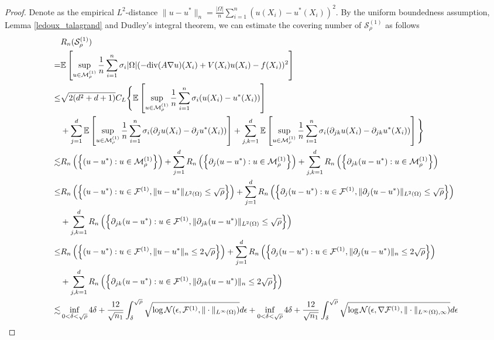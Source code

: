 \documentclass{article}
\newcommand{\E}{\mathbb{E}}
\newcommand{\F}{\mathcal{F}}
\newcommand{\N}{\mathcal{N}}
\renewcommand{\div}{\textnormal{div}}
\theoremstyle{plain}
\theoremstyle{definition}
\theoremstyle{remark}
\begin{document}
\begin{proof}
        Denote as the empirical $L^2$-distance $\|u-u^*\|_n = \frac{|\Omega|}{n}\sum_{i=1}^n (u(X_i) - u^*(X_i))^2$. 
        By the uniform boundedness assumption, Lemma \ref{ledoux_talagrand} and Dudley's integral theorem, we can estimate the covering number of $\mathcal{S}_\rho^{(1)}$ as follows
        \begin{align*}
            & R_{n}(\mathcal{S}_\rho^{(1)}) \\  = & \E \left[\sup_{u \in \mathcal{M}_\rho^{(1)}} \frac{1}{n} \sum_{i=1}^{n} \sigma_i |\Omega|(-\div(A \nabla u)(X_i) + V(X_i) u(X_i)  -f(X_i) )^2\right] \\
             \leq & \sqrt{2(d^2+d+1)} C_L \Bigg\{\E \left[\sup_{u \in \mathcal{M}_\rho^{(1)}} \frac{1}{n} \sum_{i=1}^{n} \sigma_i (u(X_i) - u^*(X_i)) \right]  \\
            & +  \sum_{j=1}^d \E \left[\sup_{u \in \mathcal{M}_\rho^{(1)}} \frac{1}{n} \sum_{i=1}^{n} \sigma_i (\partial_j u(X_i) - \partial_j u^*(X_i)) \right] + \sum_{j,k=1}^d  \E \left[\sup_{u \in \mathcal{M}_\rho^{(1)}} \frac{1}{n} \sum_{i=1}^{n} \sigma_i (\partial_{jk} u(X_i) - \partial_{jk} u^*(X_i)) \right] \Bigg\}\\
             \lesssim & R_{n} \left( \left\{ (u -u^*): u \in \mathcal{M}_\rho^{(1)}\right \}\right) + \sum_{j=1}^d R_{n} \left( \left\{ \partial_j (u -u^*): u \in \mathcal{M}_\rho^{(1)}\right \}\right)  + \sum_{j,k=1}^d R_{n} \left( \left\{ \partial_{jk} (u -u^*): u \in \mathcal{M}_\rho^{(1)}\right \}\right) \\
             \leq & R_{n} \left( \left\{ (u -u^*): u \in \F^{(1)}, \|u-u^*\|_{L^2(\Omega) }  \leq \sqrt{\rho}\right \}\right) + \sum_{j=1}^d R_n\left(\left\{\partial_j(u-u^*): u \in \F^{(1)}, \|\partial_j(u-u^*)\|_{L^2(\Omega)} \leq \sqrt{\rho} \right\}\right)\\
             & + \sum_{j,k=1}^d R_{n} \left( \left\{ \partial_{jk} (u -u^*): u \in \F^{(1)}, \|\partial_{jk} (u -u^*)\|_{L^2(\Omega)} \leq \sqrt{\rho} \right \}\right) \\
             \leq & R_{n} \left( \left\{ (u -u^*): u \in \F^{(1)}, \|u-u^*\|_{n}  \leq 2\sqrt{\rho}\right \}\right) + \sum_{j=1}^d R_n\left(\left\{\partial_j(u-u^*): u \in \F^{(1)}, \|\partial_j(u-u^*)\|_{n} \leq 2\sqrt{\rho} \right\}\right)\\
             & + \sum_{j,k=1}^d R_{n} \left( \left\{ \partial_{jk} (u -u^*): u \in \F^{(1)}, \|\partial_{jk} (u -u^*)\|_{n} \leq 2\sqrt{\rho} \right \}\right) \\
             \lesssim &  \inf_{0 < \delta < \sqrt{\rho}} 4 \delta + \frac{12}{\sqrt{n_1}} \int_\delta^{\sqrt{\rho}} \sqrt{\log \N(\epsilon,  \F^{(1)}, \|\cdot\|_{L^\infty(\Omega)})} d\epsilon  + \inf_{0 < \delta < \sqrt{\rho}} 4 \delta + \frac{12}{\sqrt{n_1}} \int_\delta^{\sqrt{\rho}} \sqrt{\log \N(\epsilon, \nabla \F^{(1)}, \|\cdot\|_{L^\infty(\Omega), \infty})} d\epsilon \\

\end{align*}
\end{proof}
\end{document}
